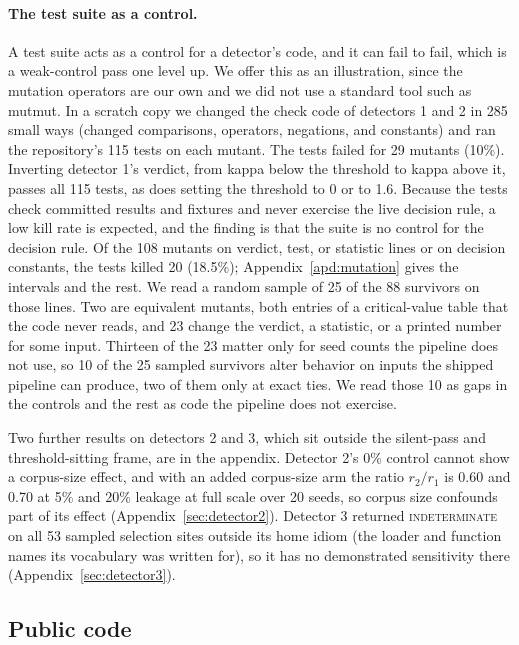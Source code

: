 \documentclass[10pt]{article}
\theoremstyle{definition}
\begin{document}
\paragraph{The test suite as a control.} A test suite acts as a control for a detector's code, and it can fail to fail, which is a weak-control pass one level up. We offer this as an illustration, since the mutation operators are our own and we did not use a standard tool such as mutmut. In a scratch copy we changed the check code of detectors 1 and 2 in 285 small ways (changed comparisons, operators, negations, and constants) and ran the repository's 115 tests on each mutant. The tests failed for 29 mutants (10\%). Inverting detector 1's verdict, from kappa below the threshold to kappa above it, passes all 115 tests, as does setting the threshold to 0 or to 1.6. Because the tests check committed results and fixtures and never exercise the live decision rule, a low kill rate is expected, and the finding is that the suite is no control for the decision rule. Of the 108 mutants on verdict, test, or statistic lines or on decision constants, the tests killed 20 (18.5\%); Appendix~\ref{apd:mutation} gives the intervals and the rest. We read a random sample of 25 of the 88 survivors on those lines. Two are equivalent mutants, both entries of a critical-value table that the code never reads, and 23 change the verdict, a statistic, or a printed number for some input. Thirteen of the 23 matter only for seed counts the pipeline does not use, so 10 of the 25 sampled survivors alter behavior on inputs the shipped pipeline can produce, two of them only at exact ties. We read those 10 as gaps in the controls and the rest as code the pipeline does not exercise.

Two further results on detectors 2 and 3, which sit outside the silent-pass and threshold-sitting frame, are in the appendix. Detector 2's 0\% control cannot show a corpus-size effect, and with an added corpus-size arm the ratio $r_2/r_1$ is 0.60 and 0.70 at 5\% and 20\% leakage at full scale over 20 seeds, so corpus size confounds part of its effect (Appendix~\ref{sec:detector2}). Detector 3 returned \textsc{indeterminate} on all 53 sampled selection sites outside its home idiom (the loader and function names its vocabulary was written for), so it has no demonstrated sensitivity there (Appendix~\ref{sec:detector3}).

\subsection{Public code}
\label{sec:external}
\end{document}
